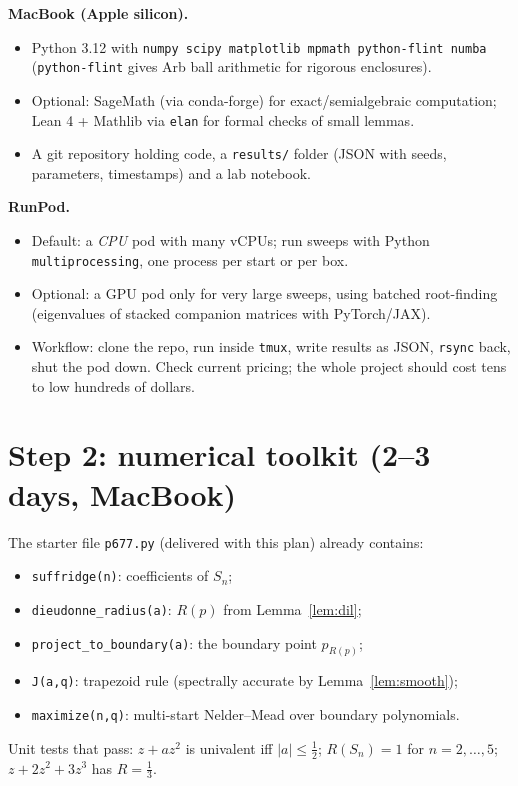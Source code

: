 \documentclass[11pt]{article}
\begin{document}
\textbf{MacBook (Apple silicon).}
\begin{itemize}[nosep]
\item Python 3.12 with \texttt{numpy scipy matplotlib mpmath python-flint numba} (\texttt{python-flint} gives Arb ball arithmetic for rigorous enclosures).
\item Optional: SageMath (via conda-forge) for exact/semialgebraic computation; Lean 4 + Mathlib via \texttt{elan} for formal checks of small lemmas.
\item A git repository holding code, a \texttt{results/} folder (JSON with seeds, parameters, timestamps) and a lab notebook.
\end{itemize}
\textbf{RunPod.}
\begin{itemize}[nosep]
\item Default: a \emph{CPU} pod with many vCPUs; run sweeps with Python \texttt{multiprocessing}, one process per start or per box.
\item Optional: a GPU pod only for very large sweeps, using batched root-finding (eigenvalues of stacked companion matrices with PyTorch/JAX).
\item Workflow: clone the repo, run inside \texttt{tmux}, write results as JSON, \texttt{rsync} back, shut the pod down. Check current pricing; the whole project should cost tens to low hundreds of dollars.
\end{itemize}

\section{Step 2: numerical toolkit (2--3 days, MacBook)}

The starter file \texttt{p677.py} (delivered with this plan) already contains:
\begin{itemize}[nosep]
\item \texttt{suffridge(n)}: coefficients of $S_n$;
\item \texttt{dieudonne\_radius(a)}: $R(p)$ from Lemma~\ref{lem:dil};
\item \texttt{project\_to\_boundary(a)}: the boundary point $p_{R(p)}$;
\item \texttt{J(a,q)}: trapezoid rule (spectrally accurate by Lemma~\ref{lem:smooth});
\item \texttt{maximize(n,q)}: multi-start Nelder--Mead over boundary polynomials.
\end{itemize}
Unit tests that pass: $z+az^2$ is univalent iff $|a|\le\tfrac12$; $R(S_n)=1$ for $n=2,\dots,5$; $z+2z^2+3z^3$ has $R=\tfrac13$.
\end{document}
